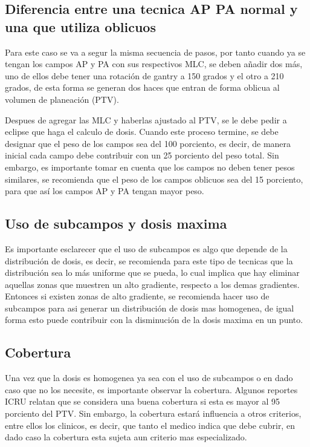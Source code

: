 \documentclass{article}
\begin{document}
\vspace{10pt}

\subsection{Diferencia entre una tecnica AP PA normal y una que utiliza oblicuos}


Para este caso se va a segur la misma secuencia de pasos, por tanto cuando ya se tengan los campos AP y PA con sus respectivos MLC, se deben añadir dos más, uno de ellos debe tener una rotación de gantry a 150 grados y el otro a 210 grados, de esta forma se generan dos haces que entran de forma oblicua al volumen de planeación (PTV). 

\vspace{10pt}


Despues de agregar las MLC y haberlas ajustado al PTV, se le debe pedir a eclipse que haga el calculo de dosis. Cuando este proceso termine, se debe designar que el peso de los campos sea del 100 porciento, es decir, de manera inicial cada campo debe contribuir con un 25 porciento del peso total. Sin embargo, es importante tomar en cuenta que los campos no deben tener pesos similares, se recomienda que el peso de los campos oblicuos sea del 15 porciento, para que así los campos AP y PA tengan mayor peso.

\subsection{Uso de subcampos y dosis maxima}

Es importante esclarecer que el uso de subcampos es algo que depende de la distribución de dosis, es decir, se recomienda para este tipo de tecnicas que la distribución sea lo más uniforme que se pueda, lo cual implica que hay eliminar aquellas zonas que muestren un alto gradiente, respecto a los demas gradientes. Entonces si existen zonas de alto gradiente, se recomienda hacer uso de subcampos para asi generar un distribución de dosis mas homogenea, de igual forma esto puede contribuir con la disminución de la dosis maxima en un punto. 

\vspace{10pt}


\subsection{Cobertura}


Una vez que la dosis es homogenea ya sea con el uso de subcampos o en dado caso que no los necesite, es importante observar la cobertura. Algunos reportes ICRU relatan que se considera una buena cobertura si esta es mayor al 95 porciento del PTV. Sin embargo, la cobertura estará influencia a otros criterios, entre ellos los clinicos, es decir, que tanto el medico indica que debe cubrir, en dado caso la cobertura esta sujeta aun criterio mas especializado. 
\end{document}
